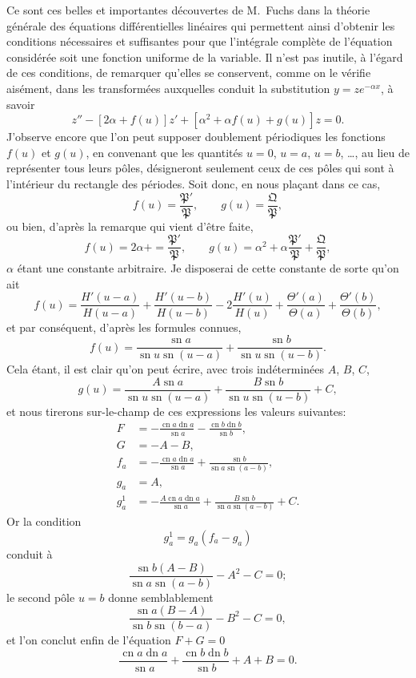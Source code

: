 \documentclass[11pt,leqno,oneside,letterpaper]{book}[2005/09/16]
\DeclareMathOperator{\sn}{sn}
\DeclareMathOperator{\cn}{cn}
\DeclareMathOperator{\dn}{dn}
\begin{document}
Ce sont ces belles et importantes d\'ecouvertes de M.~Fuchs dans
la th\'eorie g\'en\'erale des \'equations diff\'erentielles lin\'eaires qui permettent
ainsi d'obtenir les conditions n\'ecessaires et suffisantes pour que l'int\'egrale
compl\`ete de l'\'equation consid\'er\'ee soit une fonction uniforme de la variable.
Il n'est pas inutile, \`a l'\'egard de ces conditions, de remarquer
qu'elles se conservent, comme on le v\'erifie ais\'ement, dans les transform\'ees
auxquelles conduit la substitution $y = ze^{-\alpha x}$, \`a savoir
\[
z'' - \left[2\alpha + f(u)\right] z' + \left[\alpha^2 + \alpha f(u) + g(u)\right] z = 0.
\]
J'observe encore que l'on peut supposer doublement p\'eriodiques les
fonctions $f(u)$ et $g(u)$, en convenant que les quantit\'es $u = 0$, $u = a$,
$u = b$, \ldots, au lieu de repr\'esenter tous leurs p\^oles, d\'esigneront seulement
ceux de ces p\^oles qui sont \`a l'int\'erieur du rectangle des p\'eriodes. Soit
donc, en nous pla\c{c}ant dans ce cas,
\[
f(u) = \frac{\mathfrak{P'}}{\mathfrak{P}}, \qquad
g(u) = \frac{\mathfrak{Q}}{\mathfrak{P}},
\]
ou bien, d'apr\`es la remarque qui vient d'\^etre faite,
\[
f(u) = 2\alpha  + = \frac{\mathfrak{P'}}{\mathfrak{P}}, \qquad
g(u) = \alpha^2 + \alpha \frac{\mathfrak{P'}}{\mathfrak{P}} +
\frac{\mathfrak{Q}}{\mathfrak{P}},
\]
$\alpha$ \'etant une constante arbitraire. Je disposerai de cette constante de sorte
qu'on ait
\[
f(u) = \frac{H'(u-a)}{H(u-a)} +
       \frac{H'(u-b)}{H(u-b)} -
       2 \frac{H'(u)}{H(u)}   +
       \frac{\Theta'(a)}{\Theta(a)} +
       \frac{\Theta'(b)}{\Theta(b)},
\]
et par cons\'equent, d'apr\`es les formules connues,
\[
f(u) = \frac{ \sn a }{ \sn u \sn (u-a) } +
       \frac{ \sn b }{ \sn u \sn (u-b) }.
\]
Cela \'etant, il est clair qu'on peut \'ecrire, avec trois ind\'etermin\'ees $A$, $B$, $C$,
\[
g(u) = \frac{ A\sn a }{ \sn u \sn(u-a) } +
       \frac{ B\sn b }{ \sn u \sn(u-b) } + C,
\]
et nous tirerons sur-le-champ de ces expressions les valeurs suivantes:
\begin{align*}
F     &= -\frac{ \cn a \dn a }{ \sn a } - \frac{ \cn b \dn b }{ \sn b },     \\
G     &= -A - B,                                                             \\
f_a   &= -\frac{ \cn a \dn a }{ \sn a } + \frac{ \sn b }{ \sn a \sn (a-b) }, \\
g_a   &= A,                                                                  \\
g_a^1 &= -\frac{ A\cn a \dn a }{ \sn a } + \frac{ B \sn b }{ \sn a \sn (a-b)} + C.
\end{align*}
Or la condition
\[
g_a^1 = g_a(f_a - g_a)
\]
conduit \`a
\[
\frac{ \sn b (A-B) }{ \sn a \sn (a-b) } - A^2 - C = 0;
\]
le second p\^ole $u = b$ donne semblablement
\[
\frac{ \sn a (B-A) }{\sn b \sn (b-a)} - B^2 - C = 0,
\]
et l'on conclut enfin de l'\'equation $F+G=0$
\[
  \frac{ \cn a \dn a }{ \sn a } +
  \frac{ \cn b \dn b }{ \sn b } + A + B = 0.
\]
\end{document}
